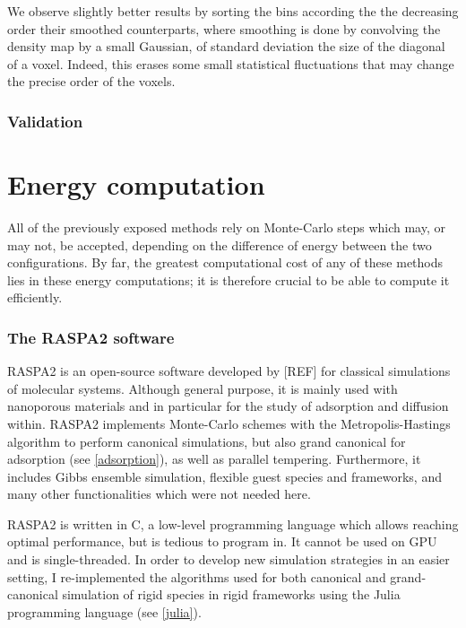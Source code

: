 \documentclass[main.tex]{subfiles}
\begin{document}
We observe slightly better results by sorting the bins according the the decreasing order their smoothed counterparts, where smoothing is done by convolving the density map by a small Gaussian, of standard deviation the size of the diagonal of a voxel. Indeed, this erases some small statistical fluctuations that may change the precise order of the voxels.

\subsubsection{Validation}

\section{Energy computation}\label{energy_computation}

All of the previously exposed methods rely on Monte-Carlo steps which may, or may not, be accepted, depending on the difference of energy between the two configurations. By far, the greatest computational cost of any of these methods lies in these energy computations; it is therefore crucial to be able to compute it efficiently.

\subsubsection{The RASPA2 software}

RASPA2 is an open-source software developed by [REF] for classical simulations of molecular systems. Although general purpose, it is mainly used with nanoporous materials and in particular for the study of adsorption and diffusion within. RASPA2 implements Monte-Carlo schemes with the Metropolis-Hastings algorithm to perform canonical simulations, but also grand canonical for adsorption (see \autoref{adsorption}), as well as parallel tempering. Furthermore, it includes Gibbs ensemble simulation, flexible guest species and frameworks, and many other functionalities which were not needed here.

RASPA2 is written in C, a low-level programming language which allows reaching optimal performance, but is tedious to program in. It cannot be used on GPU and is single-threaded. In order to develop new simulation strategies in an easier setting, I re-implemented the algorithms used for both canonical and grand-canonical simulation of rigid species in rigid frameworks using the Julia programming language (see \autoref{julia}).
\end{document}
